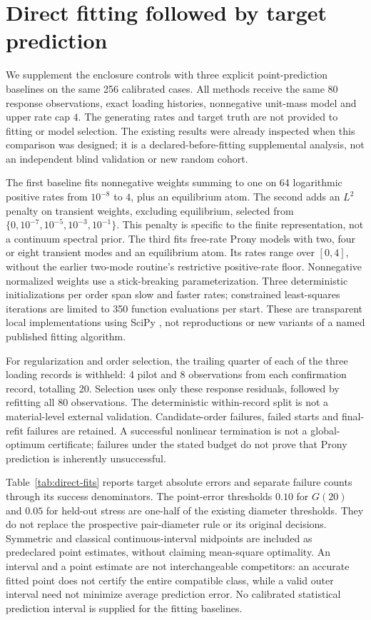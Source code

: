 \section{Direct fitting followed by target prediction}
\label{sec:direct-fits}
We supplement the enclosure controls with three explicit point-prediction baselines on the same 256 calibrated cases. All methods receive the same 80 response observations, exact loading histories, nonnegative unit-mass model and upper rate cap $4$. The generating rates and target truth are not provided to fitting or model selection. The existing results were already inspected when this comparison was designed; it is a declared-before-fitting supplemental analysis, not an independent blind validation or new random cohort.

The first baseline fits nonnegative weights summing to one on 64 logarithmic positive rates from $10^{-8}$ to $4$, plus an equilibrium atom. The second adds an $L^2$ penalty on transient weights, excluding equilibrium, selected from $\{0,10^{-7},10^{-5},10^{-3},10^{-1}\}$. This penalty is specific to the finite representation, not a continuum spectral prior. The third fits free-rate Prony models with two, four or eight transient modes and an equilibrium atom. Its rates range over $[0,4]$, without the earlier two-mode routine's restrictive positive-rate floor. Nonnegative normalized weights use a stick-breaking parameterization. Three deterministic initializations per order span slow and faster rates; constrained least-squares iterations are limited to 350 function evaluations per start. These are transparent local implementations using SciPy \cite{scipy}, not reproductions or new variants of a named published fitting algorithm.

For regularization and order selection, the trailing quarter of each of the three loading records is withheld: 4 pilot and 8 observations from each confirmation record, totalling 20. Selection uses only these response residuals, followed by refitting all 80 observations. The deterministic within-record split is not a material-level external validation. Candidate-order failures, failed starts and final-refit failures are retained. A successful nonlinear termination is not a global-optimum certificate; failures under the stated budget do not prove that Prony prediction is inherently unsuccessful.



Table~\ref{tab:direct-fits} reports target absolute errors and separate failure counts through its success denominators. The point-error thresholds $0.10$ for $G(20)$ and $0.05$ for held-out stress are one-half of the existing diameter thresholds. They do not replace the prospective pair-diameter rule or its original decisions. Symmetric and classical continuous-interval midpoints are included as predeclared point estimates, without claiming mean-square optimality. An interval and a point estimate are not interchangeable competitors: an accurate fitted point does not certify the entire compatible class, while a valid outer interval need not minimize average prediction error. No calibrated statistical prediction interval is supplied for the fitting baselines.


